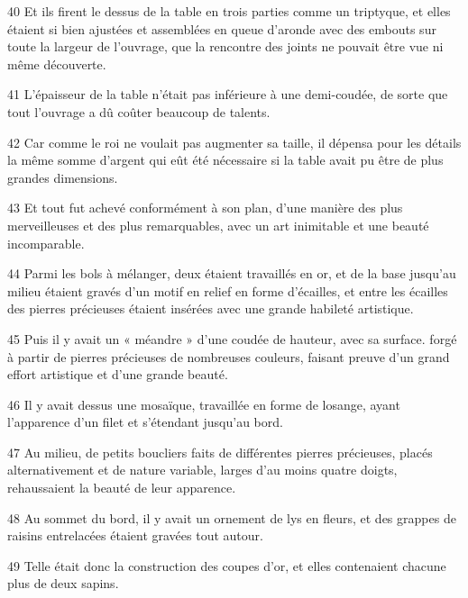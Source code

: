\par 40 Et ils firent le dessus de la table en trois parties comme un triptyque, et elles étaient si bien ajustées et assemblées en queue d'aronde avec des embouts sur toute la largeur de l'ouvrage, que la rencontre des joints ne pouvait être vue ni même découverte.

\par 41 L'épaisseur de la table n'était pas inférieure à une demi-coudée, de sorte que tout l'ouvrage a dû coûter beaucoup de talents.

\par 42 Car comme le roi ne voulait pas augmenter sa taille, il dépensa pour les détails la même somme d'argent qui eût été nécessaire si la table avait pu être de plus grandes dimensions.

\par 43 Et tout fut achevé conformément à son plan, d'une manière des plus merveilleuses et des plus remarquables, avec un art inimitable et une beauté incomparable.

\par 44 Parmi les bols à mélanger, deux étaient travaillés en or, et de la base jusqu'au milieu étaient gravés d'un motif en relief en forme d'écailles, et entre les écailles des pierres précieuses étaient insérées avec une grande habileté artistique.

\par 45 Puis il y avait un « méandre » d'une coudée de hauteur, avec sa surface. forgé à partir de pierres précieuses de nombreuses couleurs, faisant preuve d'un grand effort artistique et d'une grande beauté.

\par 46 Il y avait dessus une mosaïque, travaillée en forme de losange, ayant l'apparence d'un filet et s'étendant jusqu'au bord.

\par 47 Au milieu, de petits boucliers faits de différentes pierres précieuses, placés alternativement et de nature variable, larges d'au moins quatre doigts, rehaussaient la beauté de leur apparence.

\par 48 Au sommet du bord, il y avait un ornement de lys en fleurs, et des grappes de raisins entrelacées étaient gravées tout autour.

\par 49 Telle était donc la construction des coupes d'or, et elles contenaient chacune plus de deux sapins.

